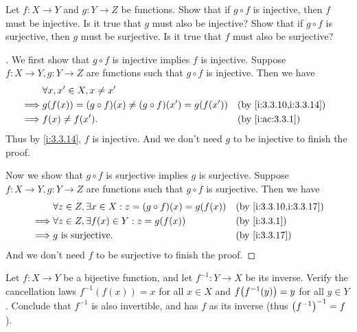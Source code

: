 \begin{ex}\label{i:ex:3.3.5}
  Let \(f : X \to Y\) and \(g : Y \to Z\) be functions.
  Show that if \(g \circ f\) is injective, then \(f\) must be injective.
  Is it true that \(g\) must also be injective?
  Show that if \(g \circ f\) is surjective, then \(g\) must be surjective.
  Is it true that \(f\) must also be surjective?
\end{ex}

\begin{proof}[]
  We first show that \(g \circ f\) is injective implies \(f\) is injective.
  Suppose \(f : X \to Y, g : Y \to Z\) are functions such that \(g \circ f\) is injective.
  Then we have
  \begin{align*}
             & \forall x, x' \in X, x \neq x'                                                       \\
    \implies & g(f(x)) = (g \circ f)(x) \neq (g \circ f)(x') = g(f(x')) &  & \by{i:3.3.10,i:3.3.14} \\
    \implies & f(x) \neq f(x').                                         &  & \by{i:ac:3.3.1}
  \end{align*}
  Thus by \cref{i:3.3.14}, \(f\) is injective.
  And we don't need \(g\) to be injective to finish the proof.

  Now we show that \(g \circ f\) is surjective implies \(g\) is surjective.
  Suppose \(f : X \to Y, g : Y \to Z\) are functions such that \(g \circ f\) is surjective.
  Then we have
  \begin{align*}
             & \forall z \in Z, \exists x \in X : z = (g \circ f)(x) = g(f(x)) &  & \by{i:3.3.10,i:3.3.17} \\
    \implies & \forall z \in Z, \exists f(x) \in Y : z = g(f(x))               &  & \by{i:3.3.1}           \\
    \implies & g \text{ is surjective}.                                        &  & \by{i:3.3.17}
  \end{align*}
  And we don't need \(f\) to be surjective to finish the proof.
\end{proof}

\begin{ex}\label{i:ex:3.3.6}
  Let \(f : X \to Y\) be a bijective function, and let \(f^{-1} : Y \to X\) be its inverse.
  Verify the cancellation laws \(f^{-1}(f(x)) = x\) for all \(x \in X\) and \(f\pa{f^{-1}(y)} = y\) for all \(y \in Y\).
  Conclude that \(f^{-1}\) is also invertible, and has \(f\) as its inverse (thus \(\left\lparen f^{-1}\right\rparen^{-1} = f\)).
\end{ex}

